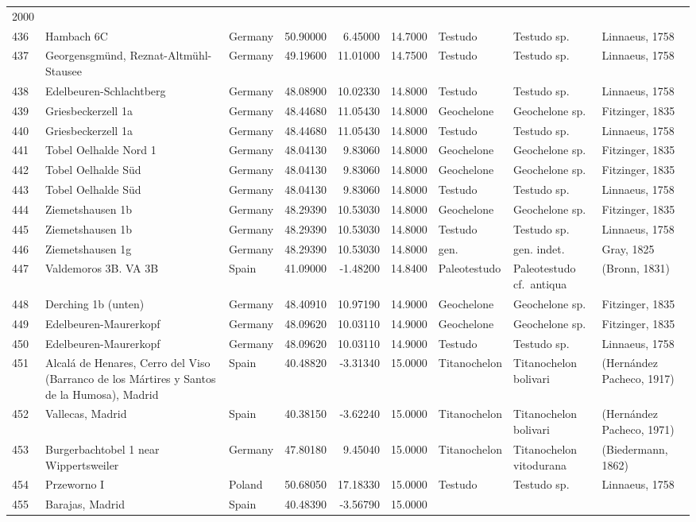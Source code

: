 \documentclass[]{article}
\begin{document}
\begin{longtable}[]{@{}lllrrrlll@{}}
2000\tabularnewline
436 & Hambach 6C & Germany & 50.90000 & 6.45000 & 14.7000 & Testudo &
Testudo sp. & Linnaeus, 1758\tabularnewline
437 & Georgensgmünd, Reznat-Altmühl-Stausee & Germany & 49.19600 &
11.01000 & 14.7500 & Testudo & Testudo sp. & Linnaeus,
1758\tabularnewline
438 & Edelbeuren-Schlachtberg & Germany & 48.08900 & 10.02330 & 14.8000
& Testudo & Testudo sp. & Linnaeus, 1758\tabularnewline
439 & Griesbeckerzell 1a & Germany & 48.44680 & 11.05430 & 14.8000 &
Geochelone & Geochelone sp. & Fitzinger, 1835\tabularnewline
440 & Griesbeckerzell 1a & Germany & 48.44680 & 11.05430 & 14.8000 &
Testudo & Testudo sp. & Linnaeus, 1758\tabularnewline
441 & Tobel Oelhalde Nord 1 & Germany & 48.04130 & 9.83060 & 14.8000 &
Geochelone & Geochelone sp. & Fitzinger, 1835\tabularnewline
442 & Tobel Oelhalde Süd & Germany & 48.04130 & 9.83060 & 14.8000 &
Geochelone & Geochelone sp. & Fitzinger, 1835\tabularnewline
443 & Tobel Oelhalde Süd & Germany & 48.04130 & 9.83060 & 14.8000 &
Testudo & Testudo sp. & Linnaeus, 1758\tabularnewline
444 & Ziemetshausen 1b & Germany & 48.29390 & 10.53030 & 14.8000 &
Geochelone & Geochelone sp. & Fitzinger, 1835\tabularnewline
445 & Ziemetshausen 1b & Germany & 48.29390 & 10.53030 & 14.8000 &
Testudo & Testudo sp. & Linnaeus, 1758\tabularnewline
446 & Ziemetshausen 1g & Germany & 48.29390 & 10.53030 & 14.8000 & gen.
& gen. indet. & Gray, 1825\tabularnewline
447 & Valdemoros 3B. VA 3B & Spain & 41.09000 & -1.48200 & 14.8400 &
Paleotestudo & Paleotestudo cf.~antiqua & (Bronn, 1831)\tabularnewline
448 & Derching 1b (unten) & Germany & 48.40910 & 10.97190 & 14.9000 &
Geochelone & Geochelone sp. & Fitzinger, 1835\tabularnewline
449 & Edelbeuren-Maurerkopf & Germany & 48.09620 & 10.03110 & 14.9000 &
Geochelone & Geochelone sp. & Fitzinger, 1835\tabularnewline
450 & Edelbeuren-Maurerkopf & Germany & 48.09620 & 10.03110 & 14.9000 &
Testudo & Testudo sp. & Linnaeus, 1758\tabularnewline
451 & Alcalá de Henares, Cerro del Viso (Barranco de los Mártires y
Santos de la Humosa), Madrid & Spain & 40.48820 & -3.31340 & 15.0000 &
Titanochelon & Titanochelon bolivari & (Hernández Pacheco,
1917)\tabularnewline
452 & Vallecas, Madrid & Spain & 40.38150 & -3.62240 & 15.0000 &
Titanochelon & Titanochelon bolivari & (Hernández Pacheco,
1971)\tabularnewline
453 & Burgerbachtobel 1 near Wippertsweiler & Germany & 47.80180 &
9.45040 & 15.0000 & Titanochelon & Titanochelon vitodurana &
(Biedermann, 1862)\tabularnewline
454 & Przeworno I & Poland & 50.68050 & 17.18330 & 15.0000 & Testudo &
Testudo sp. & Linnaeus, 1758\tabularnewline
455 & Barajas, Madrid & Spain & 40.48390 & -3.56790 & 15.0000 &

\end{longtable}
\end{document}
